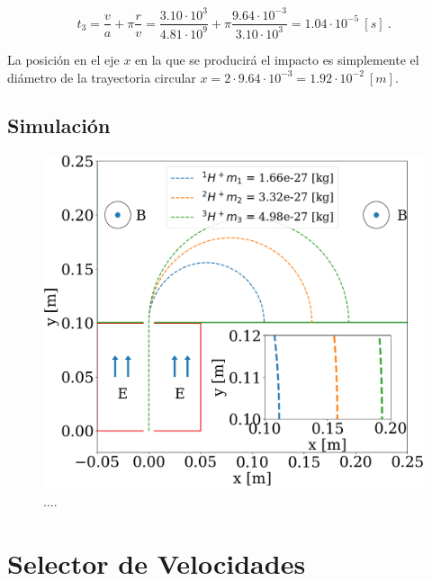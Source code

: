 \documentclass[journal]{IEEEtran}
\begin{document}
\begin{equation}
t_3 = \displaystyle\frac{v}{a} + \pi \displaystyle\frac{r}{v} = \displaystyle\frac{3.10 \cdot 10^3}{4.81 \cdot 10^{9}} + \pi \displaystyle\frac{9.64 \cdot 10^{-3}}{3.10 \cdot 10^3} = 1.04 \cdot 10^{-5}~[s]~.
\end{equation}

La posición en el eje $x$ en la que se producirá el impacto es simplemente el diámetro de la trayectoria circular $x = 2\cdot9.64 \cdot 10^{-3} = 1.92 \cdot 10^{-2}~[m]$.

\subsection{Simulación}

\begin{figure}[!htb]
    \includegraphics[width=\linewidth]{espectrometro_simulacion}
    \caption{....}
    \label{fig:espectrometro_simulacion}
\end{figure}

\clearpage

\section{Selector de Velocidades}
\label{sec:selector}
\end{document}
